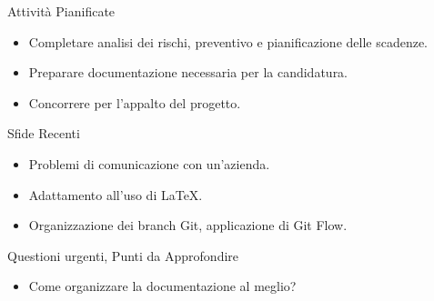 \documentclass{beamer}
\begin{document}
\begin{frame}
    \begin{block}{Attività Pianificate}
        \begin{itemize}
            \item Completare analisi dei rischi, preventivo e pianificazione delle scadenze.
            \item Preparare documentazione necessaria per la candidatura.
            \item Concorrere per l'appalto del progetto.
        \end{itemize}
    \end{block}
\end{frame}

\begin{frame}
    \begin{alertblock}{Sfide Recenti}
        \begin{itemize}
            \item Problemi di comunicazione con un'azienda.
            \item Adattamento all'uso di LaTeX.
            \item Organizzazione dei branch Git, applicazione di Git Flow.
        \end{itemize}
    \end{alertblock}
\end{frame}

\begin{frame}
    \begin{exampleblock}{Questioni urgenti, Punti da Approfondire}
        \begin{itemize}
            \item Come organizzare la documentazione al meglio?
        \end{itemize}
    \end{exampleblock}
\end{frame}
\end{document}
